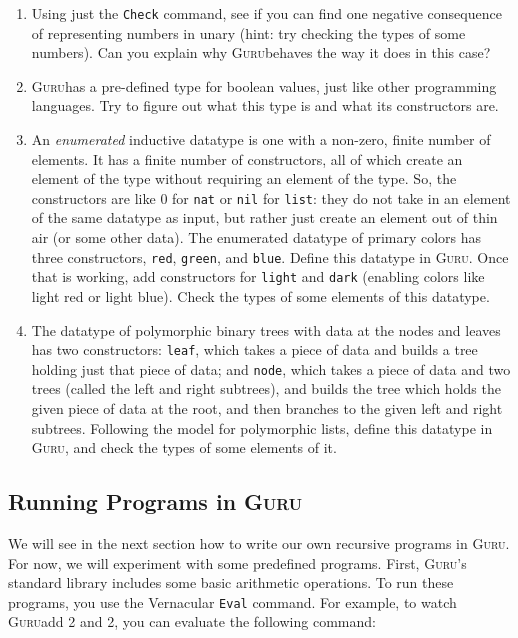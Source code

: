\documentclass{book}[12pt]
\newcommand{\guru}[0]{\textsc{Guru}}
\begin{document}
\begin{enumerate}
\item Using just the \texttt{Check} command, see if you can find one
negative consequence of representing numbers in unary (hint: try
checking the types of some numbers).  Can you explain why \guru behaves
the way it does in this case?
\item \guru has a pre-defined type for boolean values, just like other
programming languages.  Try to figure out what this type is and what
its constructors are.
\item An \emph{enumerated} inductive datatype is one with a non-zero,
finite number of elements.  It has a finite number of constructors,
all of which create an element of the type without requiring an
element of the type.  So, the constructors are like $0$ for \texttt{nat}
or \texttt{nil} for \texttt{list}: they do not take in an element of
the same datatype as input, but rather just create an element out of
thin air (or some other data).  The enumerated datatype of primary colors
has three constructors, \texttt{red}, \texttt{green}, and \texttt{blue}.
Define this datatype in \guru.  Once that is working, add constructors for
\texttt{light} and \texttt{dark} (enabling colors like light red or light
blue).  Check the types of some elements of this datatype.
\item The datatype of polymorphic binary trees with data at the nodes
and leaves has two constructors: \texttt{leaf}, which takes a piece of
data and builds a tree holding just that piece of data; and
\texttt{node}, which takes a piece of data and two trees (called the
left and right subtrees), and builds the tree which holds the given
piece of data at the root, and then branches to the given left and
right subtrees.  Following the model for polymorphic lists, define
this datatype in \guru, and check the types of some elements of it.
\end{enumerate}

\subsection{Running Programs in \guru}

We will see in the next section how to write our own recursive
programs in \guru.  For now, we will experiment with some predefined
programs.  First, \guru's standard library includes some basic
arithmetic operations.  To run these programs, you use the Vernacular
\texttt{Eval} command.  For example, to watch \guru add 2 and 2, you can
evaluate the following command:
\end{document}
